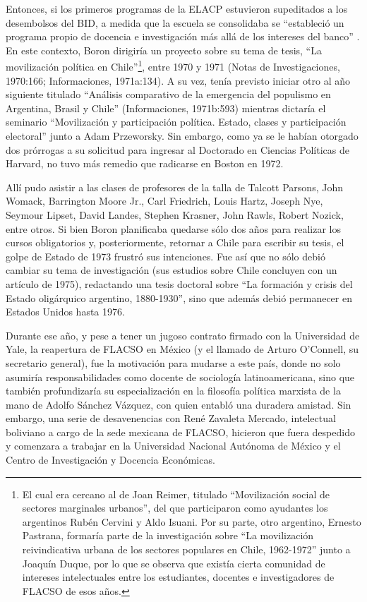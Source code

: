 Entonces, si los primeros programas de la ELACP estuvieron supeditados a los desembolsos del BID, a medida que la escuela se consolidaba se \enquote{estableció un programa propio de docencia e investigación más allá de los intereses del banco} \parencite[83]{1515-ABARZUACUTRONI2014}. En este contexto, Boron dirigiría un proyecto sobre su tema de tesis, \enquote{La movilización política en Chile}\footnote{El cual era cercano al de Joan Reimer, titulado \enquote{Movilización social de sectores marginales urbanos}, del que participaron como ayudantes los argentinos Rubén Cervini y Aldo Isuani. Por su parte, otro argentino, Ernesto Pastrana, formaría parte de la investigación sobre \enquote{La movilización reivindicativa urbana de los sectores populares en Chile, 1962-1972} junto a Joaquín Duque, por lo que se observa que existía cierta comunidad de intereses intelectuales entre los estudiantes, docentes e investigadores de FLACSO de esos años.}, entre 1970 y 1971 (Notas de Investigaciones, 1970:166; Informaciones, 1971a:134). A su vez, tenía previsto iniciar otro al año siguiente titulado \enquote{Análisis comparativo de la emergencia del populismo en Argentina, Brasil y Chile} (Informaciones, 1971b:593) mientras dictaría el seminario \enquote{Movilización y participación política. Estado, clases y participación electoral} junto a Adam Przeworsky. Sin embargo, como ya se le habían otorgado dos prórrogas a su solicitud para ingresar al Doctorado en Ciencias Políticas de Harvard, no tuvo más remedio que radicarse en Boston en 1972.

Allí pudo asistir a las clases de profesores de la talla de Talcott Parsons, John Womack, Barrington Moore Jr., Carl Friedrich, Louis Hartz, Joseph Nye, Seymour Lipset, David Landes, Stephen Krasner, John Rawls, Robert Nozick, entre otros. Si bien Boron planificaba quedarse sólo dos años para realizar los cursos obligatorios y, posteriormente, retornar a Chile para escribir su tesis, el golpe de Estado de 1973 frustró sus intenciones. Fue así que no sólo debió cambiar su tema de investigación (sus estudios sobre Chile concluyen con un artículo de 1975), redactando una tesis doctoral sobre \enquote{La formación y crisis del Estado oligárquico argentino, 1880-1930}, sino que además debió permanecer en Estados Unidos hasta 1976.

Durante ese año, y pese a tener un jugoso contrato firmado con la Universidad de Yale, la reapertura de FLACSO en México (y el llamado de Arturo O'Connell, su secretario general), fue la motivación para mudarse a este país, donde no solo asumiría responsabilidades como docente de sociología latinoamericana, sino que también profundizaría su especialización en la filosofía política marxista de la mano de Adolfo Sánchez Vázquez, con quien entabló una duradera amistad. Sin embargo, una serie de desavenencias con René Zavaleta Mercado, intelectual boliviano a cargo de la sede mexicana de FLACSO, hicieron que fuera despedido y comenzara a trabajar en la Universidad Nacional Autónoma de México y el Centro de Investigación y Docencia Económicas.

